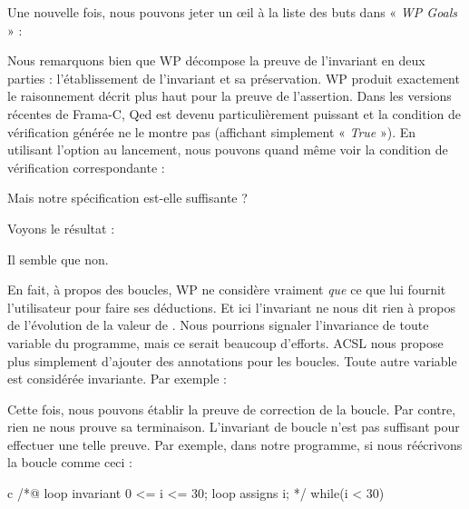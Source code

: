 Une nouvelle fois, nous pouvons jeter un œil à la liste des buts dans « \textit{WP
Goals} » :





Nous remarquons bien que WP décompose la preuve de l'invariant en deux parties :
l'établissement de l'invariant et sa préservation. WP produit exactement le
raisonnement décrit plus haut pour la preuve de l'assertion. Dans les versions
récentes de Frama-C, Qed est devenu particulièrement puissant et la condition
de vérification générée ne le montre pas (affichant simplement « \textit{True} »).
En utilisant l'option  au lancement, nous pouvons quand
même voir la condition de vérification correspondante :





Mais notre spécification est-elle suffisante ?






Voyons le résultat :





Il semble que non.





En fait, à propos des boucles, WP ne considère vraiment \textit{que} ce que lui
fournit l'utilisateur pour faire ses déductions. Et ici l'invariant ne nous dit
rien à propos de l'évolution de la valeur de . Nous pourrions signaler
l'invariance de toute variable du programme, mais ce serait beaucoup d'efforts.
ACSL nous propose plus simplement d'ajouter des annotations  pour
les boucles. Toute autre variable est considérée invariante. Par exemple :





Cette fois, nous pouvons établir la preuve de correction de la boucle. Par contre,
rien ne nous prouve sa terminaison. L'invariant de boucle n'est pas suffisant pour
effectuer une telle preuve. Par exemple, dans notre programme, si nous réécrivons
la boucle comme ceci :



\begin{CodeBlock}{c}
/*@
  loop invariant 0 <= i <= 30;
  loop assigns i;
*/
while(i < 30){

}
\end{CodeBlock}



